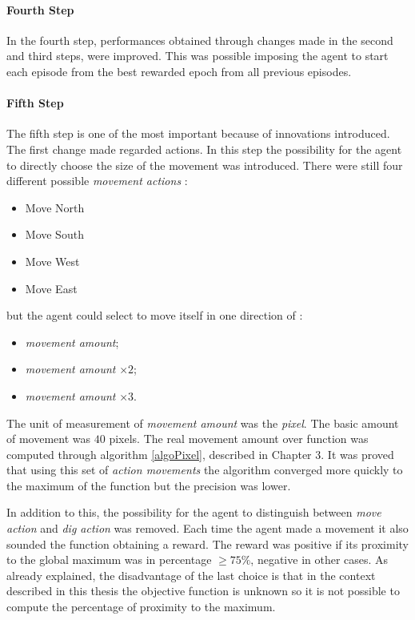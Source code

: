 \paragraph{Fourth Step} In the fourth step, performances obtained through changes made in the second and third steps, were improved. This was possible imposing the agent to start each episode from the best rewarded epoch from all previous episodes.

\paragraph{Fifth Step} The fifth step is one of the most important because of innovations introduced. The first change made regarded actions. In this step the possibility for the agent to directly choose the size of the movement was introduced. There were still four different possible \textit{movement actions} :

\begin{itemize}
	\item Move North
	\item Move South
	\item Move West
	\item Move East
\end{itemize}

but the agent could select to move itself in one direction of :

\begin{itemize}
	\item \textit{movement amount};
	\item \textit{movement amount} $\times 2$;
	\item \textit{movement amount} $\times 3$.
\end{itemize}

The unit of measurement of \textit{movement amount} was the \textit{pixel}. The basic amount of movement was $40$ pixels. The real movement amount over function was computed through algorithm \ref{algoPixel}, described in Chapter $3$. It was proved that using this set of \textit{action movements} the algorithm converged more quickly to the maximum of the function but the precision was lower. 

In addition to this, the possibility for the agent to distinguish between \textit{move action} and \textit{dig action} was removed. Each time the agent made a movement it also sounded the function obtaining a reward. The reward was positive if its proximity to the global maximum was in percentage $\ge 75\%$, negative in other cases. As already explained, the disadvantage of the last choice is that in the context described in this thesis the objective function is unknown so it is not possible to compute the percentage of proximity to the maximum.

